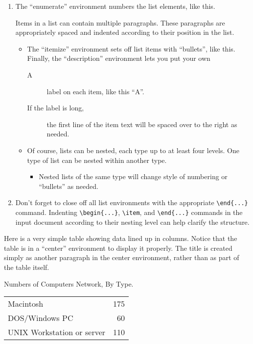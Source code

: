 \documentclass[11pt,oneside]{book}
\begin{document}
\begin{enumerate}
\item
The ``enumerate'' environment numbers the list elements, like this.

Items in a list can contain multiple paragraphs.
These paragraphs are appropriately spaced and indented according to their
position in the list.
   \begin{itemize}
   \item The ``itemize'' environment sets off list items with ``bullets'',
like this.  Finally, the ``description'' environment lets you put your own
      \begin{description}
      \item[A] label on each item, like this ``A''.
      \item[If the label is long,] the first line of the item text will
be spaced over to the right as needed.
      \end{description}
   \item Of course, lists can be nested, each type up to at least four levels.
One type of list can be nested within another type.
      \begin{itemize}
      \item Nested lists of the same type will change style of numbering
or ``bullets'' as needed.
      \end{itemize}
   \end{itemize}
\item Don't forget to close off all list environments with the
appropriate \verb+\end{...}+ command.
Indenting \verb+\begin{...}+, \verb+\item+, and \verb+\end{...}+
commands in the input document according to their nesting level can help
clarify the structure.
\end{enumerate}

Here is a very simple table showing data lined up in columns.
Notice that the table is in a ``center'' environment to display
it properly.
The title is created simply as another paragraph in the center environment,
rather than as part of the table itself.
\begin{center}
Numbers of Computers Network, By Type.

\begin{tabular}{lr}
Macintosh&175\\
DOS/Windows PC&60\\
UNIX Workstation or server&110\\
\end{tabular}
\end{center}
\end{document}
